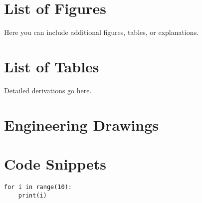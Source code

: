 \newpage
\section{List of Figures}
Here you can include additional figures, tables, or explanations.

\newpage
\section{List of Tables}
Detailed derivations go here.

\newpage
\section{Engineering Drawings}

\newpage
\section{Code Snippets}

\begin{verbatim}
for i in range(10):
    print(i)
\end{verbatim}
